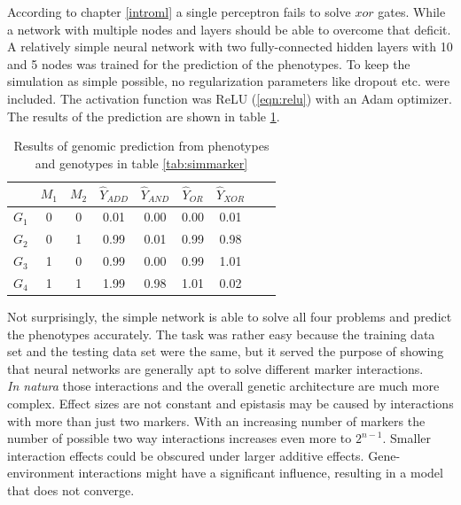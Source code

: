 According to chapter \ref{introml} a single perceptron fails to solve $xor$ gates. While a
network with multiple nodes and layers should be able to overcome that deficit. A
relatively simple neural network with two fully-connected hidden layers with 10 and 5
nodes was trained for the prediction of the phenotypes. To keep the simulation as simple
possible, no regularization parameters like dropout etc. were included. The activation
function was ReLU (\ref{eqn:relu}) with an Adam optimizer. The results of the prediction
are shown in table \ref{tab:simgpres}.

\begin{table}[H]
\caption{Results of genomic prediction from phenotypes and genotypes in table \ref{tab:simmarker}}
\label{tab:simgpres}
\centering
\begin{tabular}{ l c c | c c c c c c }
 \toprule
 & $M_1$ & $M_2$ & $\hat{Y}_{ADD}$ & $\hat{Y}_{AND}$ & $\hat{Y}_{OR}$ & $\hat{Y}_{XOR}$\\
 \midrule
 \hline 
 $G_1$ & 0 & 0 & 0.01 & 0.00 & 0.00 & 0.01 \\
 $G_2$ & 0 & 1 & 0.99 & 0.01 & 0.99 & 0.98 \\
 $G_3$ & 1 & 0 & 0.99 & 0.00 & 0.99 & 1.01 \\
 $G_4$ & 1 & 1 & 1.99 & 0.98 & 1.01 & 0.02 \\
 \bottomrule
\end{tabular}
\end{table}

Not surprisingly, the simple network is able to solve all four problems and predict the
phenotypes accurately. The task was rather easy because the training data set and the
testing data set were the same, but it served the purpose of showing that neural networks
are generally apt to solve different marker interactions. \\
\textit{In natura} those interactions and the overall genetic architecture are much more
complex. Effect sizes are not constant and epistasis may be caused by
interactions with more than just two markers. With an increasing number of markers the
number of possible two way interactions increases even more to $2^{n-1}$. Smaller
interaction effects could be obscured under larger additive effects. Gene-environment
interactions might have a significant influence, resulting in a model that does not
converge.

